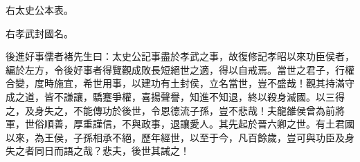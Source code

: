 右太史公本表。


右孝武封國名。

後進好事儒者褚先生曰：太史公記事盡於孝武之事，故復修記孝昭以來功臣侯者，編於左方，令後好事者得覽觀成敗長短絕世之適，得以自戒焉。當世之君子，行權合變，度時施宜，希世用事，以建功有土封侯，立名當世，豈不盛哉！觀其持滿守成之道，皆不謙讓，驕蹇爭權，喜揚聲譽，知進不知退，終以殺身滅國。以三得之，及身失之，不能傳功於後世，令恩德流子孫，豈不悲哉！夫龍雒侯曾為前將軍，世俗順善，厚重謹信，不與政事，退讓愛人。其先起於晉六卿之世。有土君國以來，為王侯，子孫相承不絕，歷年經世，以至于今，凡百餘歲，豈可與功臣及身失之者同日而語之哉？悲夫，後世其誡之！

